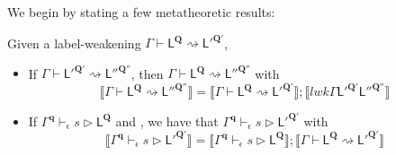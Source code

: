 \documentclass[acmsmall,screen,anonymous,review]{acmart}
\newcommand{\mb}[1]{\ensuremath{\mathbf{#1}}}
\newcommand{\ms}[1]{\ensuremath{\mathsf{#1}}}
\newcommand{\lwk}[3]{#1 \vdash #2 \rightsquigarrow #3}
\newcommand{\haslb}[4]{#1 \vdash_{#2} #3 \rhd #4}
\newcommand{\dnt}[1]{\llbracket{#1}\rrbracket}
\begin{document}
We begin by stating a few metatheoretic results:
\begin{lemma}
  Given a label-weakening $\lwk{\Gamma}{\ms{L}^{\mb{Q}}}{\ms{L}'^{\mb{Q}'}}$,
  \begin{itemize}
    \item If $\lwk{\Gamma}{\ms{L}'^{\mb{Q}'}}{\ms{L}''^{\mb{Q}''}}$, then 
      $\lwk{\Gamma}{\ms{L}^{\mb{Q}}}{\ms{L}''^{\mb{Q}''}}$ with
      $$
      \dnt{\lwk{\Gamma}{\ms{L}^{\mb{Q}}}{\ms{L}''^{\mb{Q}''}}}
      = \dnt{\lwk{\Gamma}{\ms{L}^{\mb{Q}}}{\ms{L}'^{\mb{Q}'}}}
      ; \dnt{lwk{\Gamma}{\ms{L}'^{\mb{Q}'}}{\ms{L}''^{\mb{Q}''}}}
      $$
    \item If $\haslb{\Gamma^{\mb{q}}}{\epsilon}{s}{\ms{L}^{\mb{Q}}}$ and , we have that
    $\haslb{\Gamma^{\mb{q}}}{\epsilon}{s}{\ms{L}'^{\mb{Q}'}}$ with
    $$
    \dnt{\haslb{\Gamma^{\mb{q}}}{\epsilon}{s}{\ms{L}'^{\mb{Q}'}}}
    = \dnt{\haslb{\Gamma^{\mb{q}}}{\epsilon}{s}{\ms{L}^{\mb{Q}}}}
    ; \dnt{\lwk{\Gamma}{\ms{L}^{\mb{Q}}}{\ms{L}'^{\mb{Q}'}}}
    $$
  \end{itemize}
  
\end{lemma}
\end{document}
